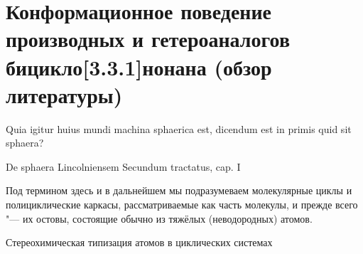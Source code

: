 \chapter{Конформационное поведение производных и гетероаналогов бицикло[3.3.1]нонана (обзор литературы)}\label{ch:Review:Basics}

\epigraph{Quia igitur huius mundi machina sphaerica est, dicendum est in primis quid sit sphaera?}{De sphaera Lincolniensem Secundum tractatus, cap. I}

Под термином  здесь и в дальнейшем мы подразумеваем молекулярные циклы и полициклические каркасы, рассматриваемые как часть молекулы, и прежде всего "--- их остовы, состоящие обычно из тяжёлых (неводородных) атомов.

\begin{center}
  \caption{Стереохимическая типизация атомов в циклических системах\label{fig:Atom:Types}}

\end{center}
